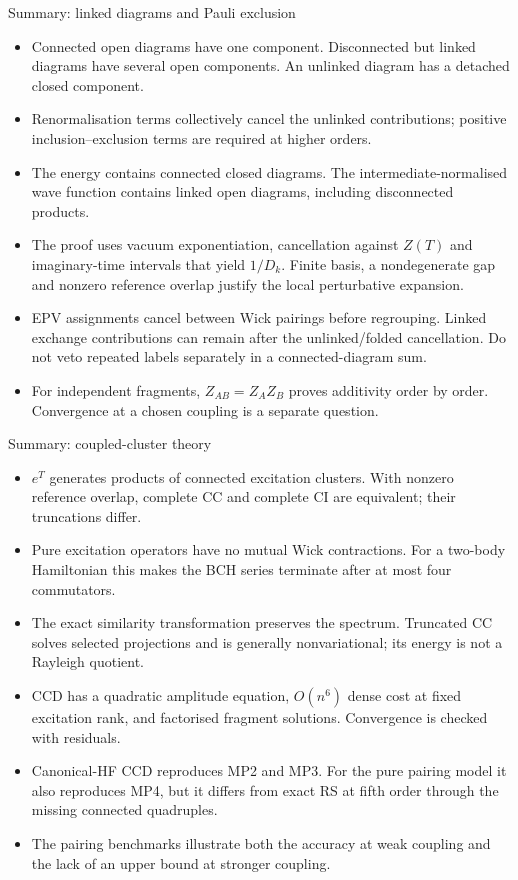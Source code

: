 \documentclass[aspectratio=169,10pt]{beamer}
\begin{document}
\begin{frame}{Summary: linked diagrams and Pauli exclusion}
\begin{itemize}
\item Connected open diagrams have one component. Disconnected but linked diagrams have several open components. An unlinked diagram has a detached closed component.
\item Renormalisation terms collectively cancel the unlinked contributions; positive inclusion--exclusion terms are required at higher orders.
\item The energy contains connected closed diagrams. The intermediate-normalised wave function contains linked open diagrams, including disconnected products.
\item The proof uses vacuum exponentiation, cancellation against $Z(T)$ and imaginary-time intervals that yield $1/D_k$. Finite basis, a nondegenerate gap and nonzero reference overlap justify the local perturbative expansion.
\item EPV assignments cancel between Wick pairings before regrouping. Linked exchange contributions can remain after the unlinked/folded cancellation. Do not veto repeated labels separately in a connected-diagram sum.
\item For independent fragments, $Z_{AB}=Z_AZ_B$ proves additivity order by order. Convergence at a chosen coupling is a separate question.
\end{itemize}
\end{frame}

\begin{frame}{Summary: coupled-cluster theory}
\begin{itemize}
\item $e^T$ generates products of connected excitation clusters. With nonzero reference overlap, complete CC and complete CI are equivalent; their truncations differ.
\item Pure excitation operators have no mutual Wick contractions. For a two-body Hamiltonian this makes the BCH series terminate after at most four commutators.
\item The exact similarity transformation preserves the spectrum. Truncated CC solves selected projections and is generally nonvariational; its energy is not a Rayleigh quotient.
\item CCD has a quadratic amplitude equation, $O(n^6)$ dense cost at fixed excitation rank, and factorised fragment solutions. Convergence is checked with residuals.
\item Canonical-HF CCD reproduces MP2 and MP3. For the pure pairing model it also reproduces MP4, but it differs from exact RS at fifth order through the missing connected quadruples.
\item The pairing benchmarks illustrate both the accuracy at weak coupling and the lack of an upper bound at stronger coupling.
\end{itemize}
\end{frame}
\end{document}
